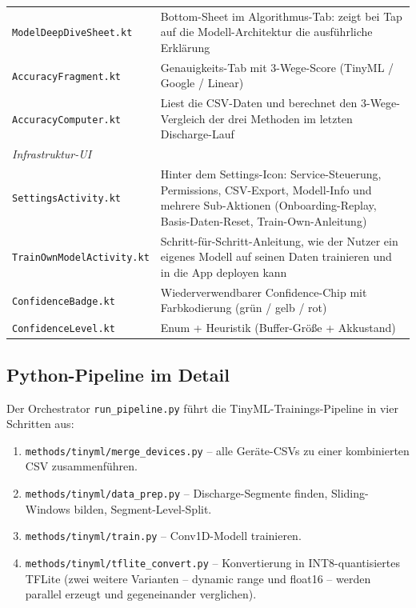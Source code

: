 \documentclass[12pt, a4paper, ngerman]{article}
\newcommand{\datei}[1]{\texttt{\small #1}}
\begin{document}
{\begin{longtable}{p{5cm}p{10cm}}
\datei{ModelDeepDiveSheet.kt}   & Bottom-Sheet im Algorithmus-Tab: zeigt bei Tap auf die Modell-Architektur die ausführliche Erklärung \\
\datei{AccuracyFragment.kt}     & Genauigkeits-Tab mit 3-Wege-Score (TinyML / Google / Linear) \\
\datei{AccuracyComputer.kt}     & Liest die CSV-Daten und berechnet den 3-Wege-Vergleich der drei Methoden im letzten Discharge-Lauf \\
\midrule
\multicolumn{2}{l}{\textit{Infrastruktur-UI}} \\
\datei{SettingsActivity.kt}     & Hinter dem Settings-Icon: Service-Steuerung, Permissions, CSV-Export, Modell-Info und mehrere Sub-Aktionen (Onboarding-Replay, Basis-Daten-Reset, Train-Own-Anleitung) \\
\datei{TrainOwnModelActivity.kt} & Schritt-für-Schritt-Anleitung, wie der Nutzer ein eigenes Modell auf seinen Daten trainieren und in die App deployen kann \\
\datei{ConfidenceBadge.kt}      & Wiederverwendbarer Confidence-Chip mit Farbkodierung (grün / gelb / rot) \\
\datei{ConfidenceLevel.kt}      & Enum + Heuristik (Buffer-Größe + Akkustand) \\
\end{longtable}
}

\subsection{Python-Pipeline im Detail}

Der Orchestrator \datei{run\_pipeline.py} führt die
TinyML-Trainings-Pipeline in vier Schritten aus:

\begin{enumerate}
\item \datei{methods/tinyml/merge\_devices.py} -- alle Geräte-CSVs
  zu einer kombinierten CSV zusammenführen.
\item \datei{methods/tinyml/data\_prep.py} -- Discharge-Segmente
  finden, Sliding-Windows bilden, Segment-Level-Split.
\item \datei{methods/tinyml/train.py} -- Conv1D-Modell trainieren.
\item \datei{methods/tinyml/tflite\_convert.py} -- Konvertierung in
  INT8-quantisiertes TFLite (zwei weitere Varianten -- dynamic
  range und float16 -- werden parallel erzeugt und gegeneinander
  verglichen).
\end{enumerate}
\end{document}
